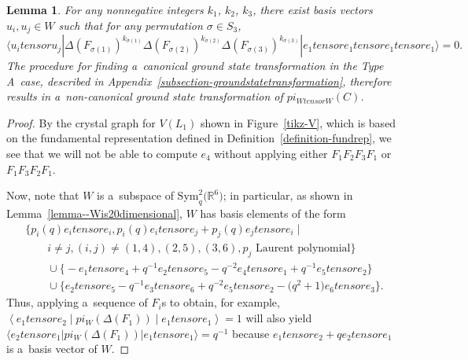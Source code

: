 \documentclass[10pt,a4paper]{amsart}
\numberwithin{equation}{section}
\newtheorem{Lemma}[Theorem]{Lemma}
\theoremstyle{definition}
\def\pi{pi}
\def\otimes{ tensor }
\begin{document}
\begin{Lemma}
\label{lemma--groundstate}
 For any nonnegative integers $k_1$, $k_2$, $k_3$, there exist basis vectors $u_i, u_j \in W$ such that for any permutation $\sigma \in S_3$,
 \[\big\langle u_i \otimes u_j| \Delta(F_{\sigma(1)})^{k_{\sigma(1)}}\Delta(F_{\sigma(2)})^{k_{\sigma(2)}}\Delta(F_{\sigma(3)})^{k_{\sigma(3)}}| e_1 \otimes e_1 \otimes e_1 \otimes e_1 \big\rangle = 0.
 \]
 The procedure for finding a~canonical ground state transformation in the Type A~case, described in Appendix~{\rm\ref{subsection-groundstatetransformation}}, therefore results in a~non-canonical ground state transformation of $\pi_{W \otimes W}(C)$.
\end{Lemma}
\begin{proof}[Proof]
 By the crystal graph for $V(L_1)$ shown in Figure~\ref{tikz-V}, which is based on the fundamental representation defined in Definition~\ref{definition-fundrep}, we see that we will not be able to compute $e_4$ without applying either $F_1F_2F_3F_1$ or $F_1F_3F_2F_1$.

Now, note that $W$ is a~subspace of $\mathrm{Sym}^2_q\bigl(\mathbb{R}^6\bigr)$; in particular, as shown in Lemma~\ref{lemma--Wis20dimensional}, $W$ has basis elements of the form
\begin{gather*}
 \{ p_i(q)e_i \otimes e_i, p_i(q)e_i \otimes e_j+p_j(q)e_j \otimes e_i  \mid\\
 \qquad i \neq j, (i,j) \neq (1,4),(2,5),(3,6), p_j \text{ Laurent polynomial}\} \\
 \qquad \cup\bigl\{ -e_1 \otimes e_4 +q^{-1}e_2 \otimes e_5 - q^{-2}e_4 \otimes e_1+q^{-1}e_5 \otimes e_2\bigr\} \\
 \qquad \cup\bigl\{e_2 \otimes e_5 - q^{-1}e_3 \otimes e_6+q^{-2}e_5 \otimes e_2 -\bigl(q^2+1\bigr)e_6 \otimes e_3\bigr\}.
\end{gather*}
Thus, applying a~sequence of $F_i$s to obtain, for example, $\left\langle e_1 \otimes e_2 \middle| \pi_W(\Delta(F_1)) \middle| e_1 \otimes e_1 \right\rangle = 1$
will also yield
$
 \langle e_2 \otimes e_1| \pi_W(\Delta(F_1))| e_1 \otimes e_1 \rangle = q^{-1}
$
because $e_1 \otimes e_2+qe_2 \otimes e_1$ is a~basis vector of $W$.



\end{proof}
\end{document}
